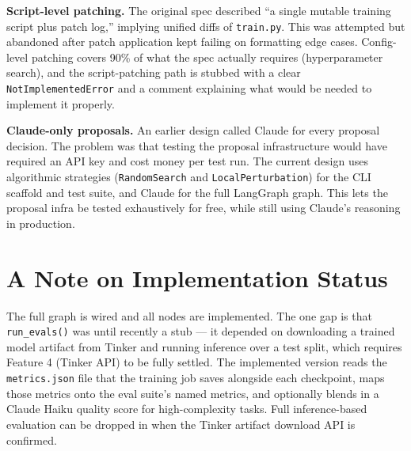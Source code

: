 \documentclass[11pt,letterpaper]{article}
\begin{document}
\textbf{Script-level patching.} The original spec described ``a single mutable training script plus patch log,'' implying unified diffs of \texttt{train.py}. This was attempted but abandoned after patch application kept failing on formatting edge cases. Config-level patching covers 90\% of what the spec actually requires (hyperparameter search), and the script-patching path is stubbed with a clear \texttt{NotImplementedError} and a comment explaining what would be needed to implement it properly.

\textbf{Claude-only proposals.} An earlier design called Claude for every proposal decision. The problem was that testing the proposal infrastructure would have required an API key and cost money per test run. The current design uses algorithmic strategies (\texttt{RandomSearch} and \texttt{LocalPerturbation}) for the CLI scaffold and test suite, and Claude for the full LangGraph graph. This lets the proposal infra be tested exhaustively for free, while still using Claude's reasoning in production.

\section{A Note on Implementation Status}

The full graph is wired and all nodes are implemented. The one gap is that \texttt{run\_evals()} was until recently a stub --- it depended on downloading a trained model artifact from Tinker and running inference over a test split, which requires Feature 4 (Tinker API) to be fully settled. The implemented version reads the \texttt{metrics.json} file that the training job saves alongside each checkpoint, maps those metrics onto the eval suite's named metrics, and optionally blends in a Claude Haiku quality score for high-complexity tasks. Full inference-based evaluation can be dropped in when the Tinker artifact download API is confirmed.
\end{document}
